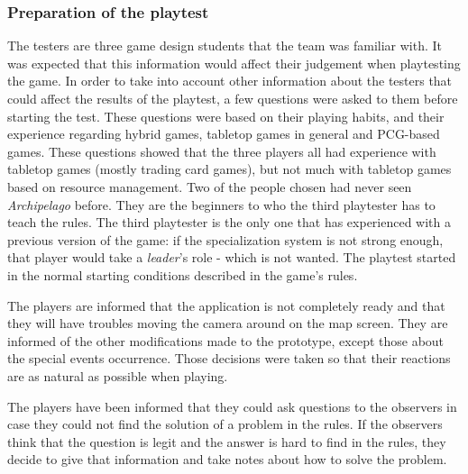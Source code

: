 \subsubsection{Preparation of the playtest}

The testers are three game design students that the team was familiar with. It was expected that this information would affect their judgement when playtesting the game. In order to take into account other information about the testers that could affect the results of the playtest, a few questions were asked to them before starting the test. These questions were based on their playing habits, and their experience regarding hybrid games, tabletop games in general and PCG-based games. These questions showed that the three players all had experience with tabletop games (mostly trading card games), but not much with tabletop games based on resource management. Two of the people chosen had never seen \textit{Archipelago} before. They are the beginners to who the third playtester has to teach the rules. The third playtester is the only one that has experienced with a previous version of the game: if the specialization system is not strong enough, that player would take a \textit{leader}'s role - which is not wanted. The playtest started in the normal starting conditions described in the game's rules.

The players are informed that the application is not completely ready and that they will have troubles moving the camera around on the map screen. They are informed of the other modifications made to the prototype, except those about the special events occurrence. Those decisions were taken so that their reactions are as natural as possible when playing.

The players have been informed that they could ask questions to the observers in case they could not find the solution of a problem in the rules. If the observers think that the question is legit and the answer is hard to find in the rules, they decide to give that information and take notes about how to solve the problem. 


